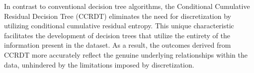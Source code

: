 \documentclass[twoside]{article}
\begin{document}
In contrast to conventional decision tree algorithms, the Conditional Cumulative Residual Decision Tree (CCRDT) eliminates the need for discretization by utilizing conditional cumulative residual entropy. This unique characteristic facilitates the development of decision trees that utilize the entirety of the information present in the dataset. As a result, the outcomes derived from CCRDT more accurately reflect the genuine underlying relationships within the data, unhindered by the limitations imposed by discretization.
\end{document}
